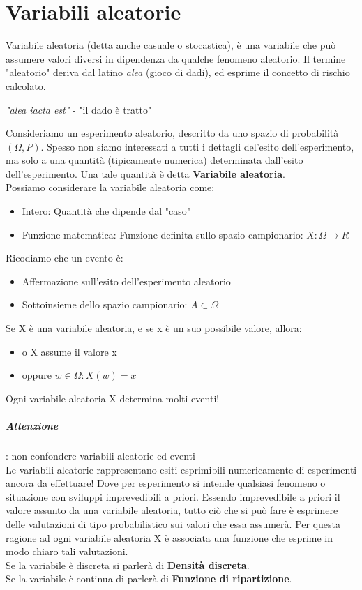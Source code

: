 \chapter{Variabili aleatorie}
Variabile aleatoria (detta anche casuale o stocastica), è una variabile che può assumere valori
diversi in dipendenza da qualche fenomeno aleatorio. Il termine "aleatorio" deriva dal latino \textit{alea} (gioco di dadi), ed esprime il
concetto di rischio calcolato.
\begin{center}
    \textit{"alea iacta est"} - "il dado è tratto"
\end{center}

Consideriamo un esperimento aleatorio, descritto da uno spazio di probabilità $(\Omega, P)$.
Spesso non siamo interessati a tutti i dettagli del'esito dell'esperimento, ma solo a 
una quantità (tipicamente numerica) determinata dall'esito dell'esperimento.
Una tale quantità è detta \textbf{Variabile aleatoria}.
\\ Possiamo considerare la variabile aleatoria come:
\begin{itemize}
    \item Intero: Quantità che dipende dal "caso"
    \item Funzione matematica: Funzione definita sullo spazio campionario: $X: \Omega \to R$
\end{itemize}
Ricodiamo che un evento è:
\begin{itemize}
    \item Affermazione sull'esito dell'esperimento aleatorio
    \item Sottoinsieme dello spazio campionario: $A \subset \Omega$
\end{itemize}

Se X è una variabile aleatoria, e se x è un suo possibile valore, allora:
\begin{itemize}
    \item o X assume il valore x
    \item oppure ${w \in \Omega: X(w) = x }$
\end{itemize}

Ogni variabile aleatoria X determina molti eventi!
\paragraph{Attenzione}: non confondere variabili aleatorie ed eventi
\\ Le variabili aleatorie rappresentano esiti esprimibili numericamente di esperimenti
ancora da effettuare! Dove per esperimento si intende qualsiasi fenomeno o situazione con sviluppi
imprevedibili a priori. Essendo imprevedibile a priori il valore assunto da una variabile
aleatoria, tutto ciò che si può fare è esprimere delle valutazioni di tipo probabilistico sui valori
che essa assumerà. Per questa ragione ad ogni variabile aleatoria X è associata una funzione che esprime
in modo chiaro tali valutazioni. 
\\Se la variabile è discreta si parlerà di \textbf{Densità discreta}.
\\Se la variabile è continua di parlerà di \textbf{Funzione di ripartizione}.

